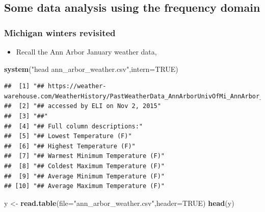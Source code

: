 \documentclass[]{article}
\newenvironment{Shaded}{\begin{snugshade}}{\end{snugshade}}
\newcommand{\KeywordTok}[1]{\textcolor[rgb]{0.13,0.29,0.53}{\textbf{#1}}}
\newcommand{\DataTypeTok}[1]{\textcolor[rgb]{0.13,0.29,0.53}{#1}}
\newcommand{\StringTok}[1]{\textcolor[rgb]{0.31,0.60,0.02}{#1}}
\newcommand{\OtherTok}[1]{\textcolor[rgb]{0.56,0.35,0.01}{#1}}
\newcommand{\NormalTok}[1]{#1}
\providecommand{\tightlist}{%
  \setlength{\itemsep}{0pt}\setlength{\parskip}{0pt}}
\begin{document}
\subsection{Some data analysis using the frequency
domain}\label{some-data-analysis-using-the-frequency-domain}

\subsubsection{Michigan winters
revisited}\label{michigan-winters-revisited}

\begin{itemize}
\tightlist
\item
  Recall the Ann Arbor January weather data,
\end{itemize}

\begin{Shaded}
\begin{Highlighting}[]
\KeywordTok{system}\NormalTok{(}\StringTok{"head ann_arbor_weather.csv"}\NormalTok{,}\DataTypeTok{intern=}\OtherTok{TRUE}\NormalTok{)}
\end{Highlighting}
\end{Shaded}

\begin{verbatim}
##  [1] "## https://weather-warehouse.com/WeatherHistory/PastWeatherData_AnnArborUnivOfMi_AnnArbor_MI_January.html"
##  [2] "## accessed by ELI on Nov 2, 2015"                                                                        
##  [3] "##"                                                                                                       
##  [4] "## Full column descriptions:"                                                                             
##  [5] "## Lowest Temperature (F)"                                                                                
##  [6] "## Highest Temperature (F)"                                                                               
##  [7] "## Warmest Minimum Temperature (F)"                                                                       
##  [8] "## Coldest Maximum Temperature (F)"                                                                       
##  [9] "## Average Minimum Temperature (F)"                                                                       
## [10] "## Average Maximum Temperature (F)"
\end{verbatim}

\begin{Shaded}
\begin{Highlighting}[]
\NormalTok{y <-}\StringTok{ }\KeywordTok{read.table}\NormalTok{(}\DataTypeTok{file=}\StringTok{"ann_arbor_weather.csv"}\NormalTok{,}\DataTypeTok{header=}\OtherTok{TRUE}\NormalTok{)}
\KeywordTok{head}\NormalTok{(y)}
\end{Highlighting}
\end{Shaded}
\end{document}

